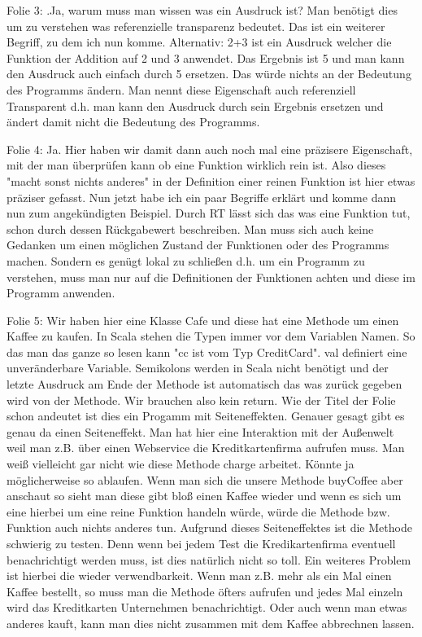 \begin{frame}
	Folie 3: .Ja, warum muss man wissen was ein Ausdruck ist? Man benötigt dies um zu verstehen was referenzielle transparenz bedeutet. Das ist ein weiterer Begriff, zu dem ich nun komme. Alternativ: 2+3 ist ein Ausdruck welcher die Funktion der Addition auf 2 und 3 anwendet. Das Ergebnis ist 5 und man kann den Ausdruck auch einfach durch 5 ersetzen. Das würde nichts an der Bedeutung des Programms ändern. Man nennt diese Eigenschaft auch referenziell Transparent d.h. man kann den Ausdruck durch sein Ergebnis ersetzen und ändert damit nicht die Bedeutung des Programms. 
	
	Folie 4: Ja. Hier haben wir damit dann auch noch mal eine präzisere 
	Eigenschaft, mit der man überprüfen kann ob eine Funktion wirklich rein ist. Also dieses "macht sonst nichts anderes" in der Definition einer reinen Funktion ist hier etwas präziser gefasst. Nun jetzt habe ich ein paar Begriffe erklärt und komme dann nun zum angekündigten Beispiel. Durch RT lässt sich das was eine Funktion tut, schon durch dessen Rückgabewert beschreiben. Man muss sich auch keine Gedanken um einen möglichen Zustand der Funktionen oder des Programms machen. Sondern es genügt lokal zu schließen d.h. um ein Programm zu verstehen, muss man nur auf die Definitionen der Funktionen achten und diese im Programm anwenden.  
	
	Folie 5: Wir haben hier eine Klasse Cafe und diese hat eine Methode um einen Kaffee zu kaufen. In Scala stehen die Typen immer vor dem Variablen Namen. So das man das ganze so lesen kann "cc ist vom Typ CreditCard". val definiert eine unveränderbare Variable. Semikolons werden in Scala nicht benötigt und der letzte Ausdruck am Ende der Methode ist automatisch das was zurück gegeben wird von der Methode. Wir brauchen also kein return. Wie der Titel der Folie schon andeutet ist dies ein Progamm mit Seiteneffekten. Genauer gesagt gibt es genau da einen Seiteneffekt. Man hat hier eine Interaktion mit der Außenwelt weil man z.B. über einen Webservice die Kreditkartenfirma aufrufen muss. Man weiß vielleicht gar nicht wie diese Methode charge arbeitet. Könnte ja möglicherweise so ablaufen. Wenn man sich die unsere Methode buyCoffee aber anschaut so sieht man diese gibt bloß einen Kaffee wieder und wenn es sich um eine hierbei um eine reine Funktion handeln würde, würde die Methode bzw. Funktion auch nichts anderes tun. Aufgrund dieses  Seiteneffektes ist die Methode schwierig zu testen. Denn wenn bei jedem Test die Kredikartenfirma eventuell benachrichtigt werden muss, ist dies natürlich nicht so toll. Ein weiteres Problem ist hierbei die wieder verwendbarkeit. Wenn man z.B. mehr als ein Mal einen Kaffee bestellt,
so muss man die Methode öfters aufrufen und jedes Mal einzeln wird das Kreditkarten Unternehmen benachrichtigt. Oder auch wenn man etwas anderes kauft, kann man dies nicht zusammen mit dem Kaffee abbrechnen lassen. 


\end{frame}

